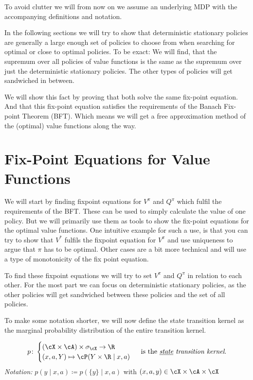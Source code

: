 To avoid clutter we will from now on we assume an underlying MDP with the accompanying definitions and notation.

In the following sections we will try to show that deterministic stationary policies are generally a large enough set of policies to choose from when searching for optimal or close to optimal policies. To be exact: We will find, that the supremum over all policies of value functions is the same as the supremum over just the deterministic stationary policies. The other types of policies will get sandwiched in between.

We will show this fact by proving that both solve the same fix-point equation. And that this fix-point equation satisfies the requirements of the Banach Fix-point Theorem (BFT). Which means we will get a free approximation method of the (optimal) value functions along the way.

\section{Fix-Point Equations for Value Functions}
We will start by finding fixpoint equations for \(V^\pi\) and \(Q^\pi\) which fulfil the requirements of the BFT. These can be used to simply calculate the value of one policy. But we will primarily use them as tools to show the fix-point equations for the optimal value functions. One intuitive example for such a use, is that you can try to show that \(V^*\) fulfils the fixpoint equation for \(V^\pi\) and use uniqueness to argue that \(\pi\) has to be optimal. Other cases are a bit more technical and will use a type of monotonicity of the fix point equation.

To find these fixpoint equations we will try to set \(V^\pi\) and \(Q^\pi\) in relation to each other. For the most part we can focus on deterministic stationary policies, as the other policies will get sandwiched between these policies and the set of all policies.

To make some notation shorter, we will now define the state transition kernel as the marginal probability distribution of the entire transition kernel.

\begin{definition}
	\[
	p\colon 
	\begin{cases}
		(\cX\times\cA)\times\sigma_\cX\to\R\\
		(x,a,Y)\mapsto \cP(Y\times\R\mid x,a)
	\end{cases}\text{ is the \emph{\underline{state} transition kernel}.}
	\] 
\emph{Notation:} \(p(y\mid x,a)\coloneqq p(\{y\}\mid x,a)\) with \((x,a,y)\in\cX\times\cA\times\cX\)
\end{definition}

